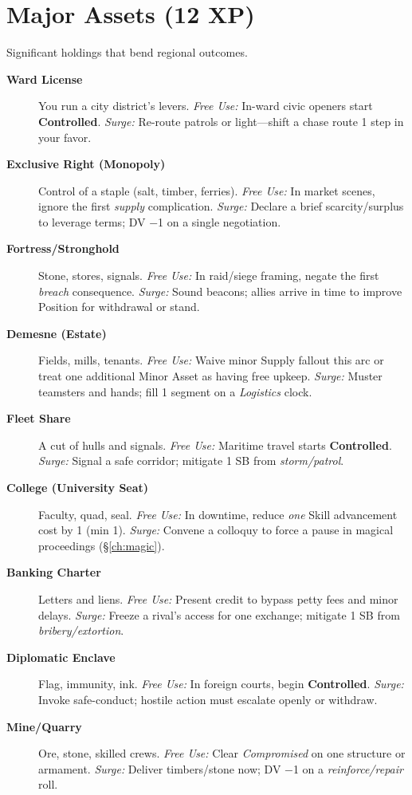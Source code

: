 \section{Major Assets (12 XP)}
Significant holdings that bend regional outcomes.
\begin{description}
  \item[\textbf{Ward License}]  You run a city district's levers. \emph{Free Use:} In-ward civic openers start \textbf{Controlled}. \emph{Surge:} Re-route patrols or light—shift a chase route 1 step in your favor.
  \item[\textbf{Exclusive Right (Monopoly)}]  Control of a staple (salt, timber, ferries). \emph{Free Use:} In market scenes, ignore the first \emph{supply} complication. \emph{Surge:} Declare a brief scarcity/surplus to leverage terms; DV −1 on a single negotiation.
  \item[\textbf{Fortress/Stronghold}]  Stone, stores, signals. \emph{Free Use:} In raid/siege framing, negate the first \emph{breach} consequence. \emph{Surge:} Sound beacons; allies arrive in time to improve Position for withdrawal or stand.
  \item[\textbf{Demesne (Estate)}]  Fields, mills, tenants. \emph{Free Use:} Waive minor Supply fallout this arc or treat one additional Minor Asset as having free upkeep. \emph{Surge:} Muster teamsters and hands; fill 1 segment on a \emph{Logistics} clock.
  \item[\textbf{Fleet Share}]  A cut of hulls and signals. \emph{Free Use:} Maritime travel starts \textbf{Controlled}. \emph{Surge:} Signal a safe corridor; mitigate 1 SB from \emph{storm/patrol}.
  \item[\textbf{College (University Seat)}]  Faculty, quad, seal. \emph{Free Use:} In downtime, reduce \emph{one} Skill advancement cost by 1 (min 1). \emph{Surge:} Convene a colloquy to force a pause in magical proceedings (\S\ref{ch:magic}).
  \item[\textbf{Banking Charter}]  Letters and liens. \emph{Free Use:} Present credit to bypass petty fees and minor delays. \emph{Surge:} Freeze a rival's access for one exchange; mitigate 1 SB from \emph{bribery/extortion}.
  \item[\textbf{Diplomatic Enclave}]  Flag, immunity, ink. \emph{Free Use:} In foreign courts, begin \textbf{Controlled}. \emph{Surge:} Invoke safe-conduct; hostile action must escalate openly or withdraw.
  \item[\textbf{Mine/Quarry}]  Ore, stone, skilled crews. \emph{Free Use:} Clear \emph{Compromised} on one structure or armament. \emph{Surge:} Deliver timbers/stone now; DV −1 on a \emph{reinforce/repair} roll.
\end{description}

